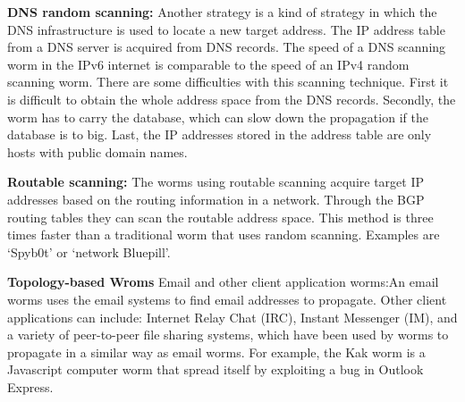 \begin{description}
\item \textbf{DNS random scanning:} Another strategy is a kind of strategy in which the DNS infrastructure is used to locate a new target address. The IP address table from a DNS server is acquired from DNS records. The speed of a DNS scanning worm in the IPv6 internet is comparable to the speed of an IPv4 random scanning worm. There are some difficulties with this scanning technique. First it is difficult to obtain the whole address space from the DNS records. Secondly, the worm has to carry the database, which can slow down the propagation if the database is to big. Last, the IP addresses stored in the address table are only hosts with public domain names.
\item \textbf{Routable scanning:} The worms using routable scanning acquire target IP addresses based on the routing information in a network. Through  the BGP routing tables they can scan the routable address space. This method is three times faster than a traditional worm that uses random scanning. Examples are `Spyb0t' or `network Bluepill'. 

\item \textbf{Topology-based Wroms} Email and other client application worms:An email worms uses the email systems to find email addresses to propagate. Other client applications can include: Internet Relay Chat (IRC), Instant Messenger (IM), and a variety of peer-to-peer
file sharing systems, which have been used by worms to propagate in a similar way as email worms. For example, the Kak worm is a Javascript computer worm that spread itself by exploiting a bug in Outlook Express. %


\end{description}
